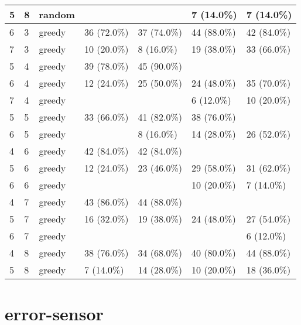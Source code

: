 \documentclass[oneside,canadian,landscape]{article}
\begin{document}
\begin{center}
\begin{longtable}{|l|l|l||l|l|l|l|}
5&8&random&&&7 (14.0\%)&7 (14.0\%)\\ \hline
6&3&greedy&36 (72.0\%)&37 (74.0\%)&44 (88.0\%)&42 (84.0\%)\\ \hline
7&3&greedy&10 (20.0\%)&8 (16.0\%)&19 (38.0\%)&33 (66.0\%)\\ \hline
5&4&greedy&39 (78.0\%)&45 (90.0\%)&&\\ \hline
6&4&greedy&12 (24.0\%)&25 (50.0\%)&24 (48.0\%)&35 (70.0\%)\\ \hline
7&4&greedy&&&6 (12.0\%)&10 (20.0\%)\\ \hline
5&5&greedy&33 (66.0\%)&41 (82.0\%)&38 (76.0\%)&\\ \hline
6&5&greedy&&8 (16.0\%)&14 (28.0\%)&26 (52.0\%)\\ \hline
4&6&greedy&42 (84.0\%)&42 (84.0\%)&&\\ \hline
5&6&greedy&12 (24.0\%)&23 (46.0\%)&29 (58.0\%)&31 (62.0\%)\\ \hline
6&6&greedy&&&10 (20.0\%)&7 (14.0\%)\\ \hline
4&7&greedy&43 (86.0\%)&44 (88.0\%)&&\\ \hline
5&7&greedy&16 (32.0\%)&19 (38.0\%)&24 (48.0\%)&27 (54.0\%)\\ \hline
6&7&greedy&&&&6 (12.0\%)\\ \hline
4&8&greedy&38 (76.0\%)&34 (68.0\%)&40 (80.0\%)&44 (88.0\%)\\ \hline
5&8&greedy&7 (14.0\%)&14 (28.0\%)&10 (20.0\%)&18 (36.0\%)\\ \hline
\end{longtable}
\end{center}
\section{error-sensor}
\end{document}
